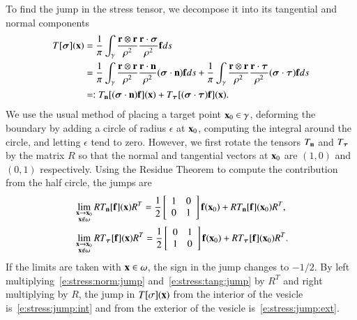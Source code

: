 To find the jump in the stress tensor, we decompose it into its tangential and normal components
\begin{align*}
  T[{\boldsymbol\sigma}]({\mathbf{x}}) &= \frac{1}{\pi}\int_{\gamma}\frac{{\mathbf{r}} \otimes {\mathbf{r}}}{\rho^{2}}
    \frac{{\mathbf{r}} \cdot {\boldsymbol\sigma}}{\rho^{2}} {\mathbf{f}} ds \\
  &= \frac{1}{\pi}\int_{\gamma}\frac{{\mathbf{r}} \otimes {\mathbf{r}}}{\rho^{2}}
    \frac{{\mathbf{r}} \cdot {\mathbf{n}}}{\rho^{2}}({\boldsymbol\sigma} \cdot {\mathbf{n}}){\mathbf{f}} ds + 
    \frac{1}{\pi}\int_{\gamma}\frac{{\mathbf{r}} \otimes {\mathbf{r}}}{\rho^{2}}
    \frac{{\mathbf{r}} \cdot {\boldsymbol\tau}}{\rho^{2}}({\boldsymbol\sigma} \cdot {\boldsymbol\tau}){\mathbf{f}} ds \\
    &=: T_{{\mathbf{n}}}[({\boldsymbol\sigma} \cdot {\mathbf{n}}){\mathbf{f}}]({\mathbf{x}}) + 
    T_{{\boldsymbol\tau}}[({\boldsymbol\sigma} \cdot {\boldsymbol\tau}){\mathbf{f}}]({\mathbf{x}}). 
\end{align*}
We use the usual method of placing a target point ${\mathbf{x}}_{0} \in \gamma$, deforming the boundary by adding a circle of radius $\epsilon$ at ${\mathbf{x}}_{0}$, computing the integral around the circle, and letting $\epsilon$ tend to zero.  However, we first rotate the tensors $T_{{\mathbf{n}}}$ and $T_{{\boldsymbol\tau}}$ by the matrix $R$ so that the normal and tangential vectors at ${\mathbf{x}}_{0}$ are $(1,0)$ and $(0,1)$ respectively.  Using the Residue Theorem to compute the contribution from the half circle, the jumps are 
\begin{align}
  &\lim_{\substack{{\mathbf{x}} \rightarrow {\mathbf{x}}_{0} \\ {\mathbf{x}} \notin \omega}} 
    R T_{{\mathbf{n}}}[{\mathbf{f}}]({\mathbf{x}}) R^{T} = \frac{1}{2}\left[
    \begin{array}{cc}
      1 & 0 \\ 0 & 1
    \end{array}
    \right] {\mathbf{f}}({\mathbf{x}}_{0}) + R T_{{\mathbf{n}}}[{\mathbf{f}}]({\mathbf{x}}_{0}) R^{T}, 
    \label{e:stress:norm:jump} \\
  &\lim_{\substack{{\mathbf{x}} \rightarrow {\mathbf{x}}_{0} \\ {\mathbf{x}} \notin \omega}} 
    R T_{{\boldsymbol\tau}}[{\mathbf{f}}]({\mathbf{x}}) R^{T} = \frac{1}{2}\left[
    \begin{array}{cc}
      0 & 1 \\ 1 & 0
    \end{array}
    \right] {\mathbf{f}}({\mathbf{x}}_{0}) + R T_{{\boldsymbol\tau}}[{\mathbf{f}}]({\mathbf{x}}_{0}) R^{T}. 
    \label{e:stress:tang:jump}
\end{align}
If the limits are taken with ${\mathbf{x}} \in \omega$, the sign in the jump
changes to $-1/2$.  By left multiplying~\eqref{e:stress:norm:jump}
and~\eqref{e:stress:tang:jump} by $R^{T}$ and right multiplying by $R$,
the jump in $T[\sigma]({\mathbf{x}})$ from the interior of the vesicle
is~\eqref{e:stress:jump:int} and from the exterior of the vesicle
is~\eqref{e:stress:jump:ext}.

